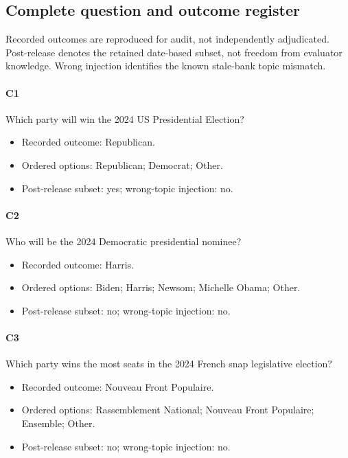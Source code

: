 \subsection{Complete question and outcome register}

Recorded outcomes are reproduced for audit, not independently adjudicated. Post-release denotes the retained date-based subset, not freedom from evaluator knowledge. Wrong injection identifies the known stale-bank topic mismatch.

\paragraph*{C1} Which party will win the 2024 US Presidential Election?

\begin{itemize}

\item Recorded outcome: Republican.

\item Ordered options: Republican; Democrat; Other.

\item Post-release subset: yes; wrong-topic injection: no.

\end{itemize}

\paragraph*{C2} Who will be the 2024 Democratic presidential nominee?

\begin{itemize}

\item Recorded outcome: Harris.

\item Ordered options: Biden; Harris; Newsom; Michelle Obama; Other.

\item Post-release subset: no; wrong-topic injection: no.

\end{itemize}

\paragraph*{C3} Which party wins the most seats in the 2024 French snap legislative election?

\begin{itemize}

\item Recorded outcome: Nouveau Front Populaire.

\item Ordered options: Rassemblement National; Nouveau Front Populaire; Ensemble; Other.

\item Post-release subset: no; wrong-topic injection: no.

\end{itemize}

